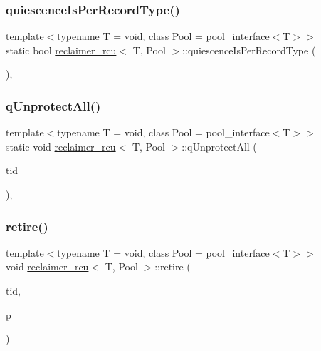 \mbox{\label{classreclaimer__rcu_a6dc43b3dbe423012ae7ccea223a820c7}} 
\subsubsection{\texorpdfstring{quiescence\+Is\+Per\+Record\+Type()}{quiescenceIsPerRecordType()}}
{\footnotesize\ttfamily template$<$typename T  = void, class Pool  = pool\+\_\+interface$<$\+T$>$$>$ \\
static bool \hyperlink{classreclaimer__rcu}{reclaimer\+\_\+rcu}$<$ T, Pool $>$\+::quiescence\+Is\+Per\+Record\+Type (\begin{DoxyParamCaption}{ }\end{DoxyParamCaption})\hspace{0.3cm}{\ttfamily [inline]}, {\ttfamily [static]}}

\mbox{\label{classreclaimer__rcu_a27f67a0be3fad8a808e397ad1ffd73e6}} 
\subsubsection{\texorpdfstring{q\+Unprotect\+All()}{qUnprotectAll()}}
{\footnotesize\ttfamily template$<$typename T  = void, class Pool  = pool\+\_\+interface$<$\+T$>$$>$ \\
static void \hyperlink{classreclaimer__rcu}{reclaimer\+\_\+rcu}$<$ T, Pool $>$\+::q\+Unprotect\+All (\begin{DoxyParamCaption}\item[{const int}]{tid }\end{DoxyParamCaption})\hspace{0.3cm}{\ttfamily [inline]}, {\ttfamily [static]}}

\mbox{\label{classreclaimer__rcu_aff8e363574a08a689a24e355147e38b4}} 
\subsubsection{\texorpdfstring{retire()}{retire()}}
{\footnotesize\ttfamily template$<$typename T  = void, class Pool  = pool\+\_\+interface$<$\+T$>$$>$ \\
void \hyperlink{classreclaimer__rcu}{reclaimer\+\_\+rcu}$<$ T, Pool $>$\+::retire (\begin{DoxyParamCaption}\item[{const int}]{tid,  }\item[{T $\ast$}]{p }\end{DoxyParamCaption})\hspace{0.3cm}{\ttfamily [inline]}}

